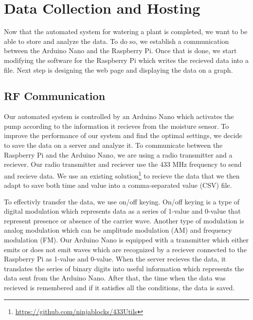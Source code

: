 \documentclass[conference]{IEEEtran}
\begin{document}
\section{Data Collection and Hosting}
\label{sec:collection}


Now that the automated system for watering a plant is completed, we want to be able to store and analyze the data.
To do so, we establish a communication between the Arduino Nano and the Raspberry Pi.
Once that is done, we start modifying the software for the Raspberry Pi which writes the recieved data into a file.
Next step is designing the web page and displaying the data on a graph.

\subsection{RF Communication}

Our automated system is controlled by an Arduino Nano which activates the pump according to the information it recieves from the moisture sensor.
To improve the performance of our system and find the optimal settings, we decide to save the data on a server and analyze it.
To communicate between the Raspberry Pi and the Arduino Nano, we are using a radio transmitter and a reciever.
Our radio transmitter and reciever use the 433 MHz frequency to send and recieve data.
We use an existing solution\footnote{\url{https://github.com/ninjablocks/433Utils}}\cite{WiringPi} to recieve the data that we then adapt to save both time and value into a comma-separated value (CSV) file.


To effectivly transfer the data, we use on/off keying.
On/off keying is a type of digital modulation which represents data as a series of 1-value and 0-value that represent presence or absence of the carrier wave.
Another type of modulation is analog modulation which can be amplitude modulation (AM) and frequency modulation (FM).
Our Arduino Nano is equipped with a transmitter which either emits or does not emit waves which are recognized by a reciever connected to the Raspberry Pi as 1-value and 0-value.
When the server recieves the data, it translates the series of binary digits into useful information which represents the data sent from the Arduino Nano.
After that, the time when the data was recieved is remembered and if it satisfies all the conditions, the data is saved.
\end{document}
